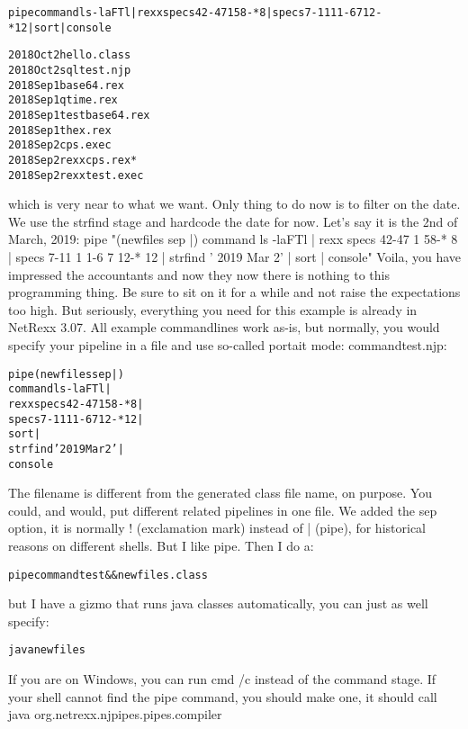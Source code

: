 \begin{alltt}
pipe command ls -laFTl | rexx specs 42-47 1 58-* 8 | specs 7-11 1 1-6 7 12-* 12 | sort | console
\end{alltt}
\begin{alltt}
2018 Oct 2 hello.class
2018 Oct 2 sqltest.njp
2018 Sep 1 base64.rex
2018 Sep 1 qtime.rex
2018 Sep 1 testbase64.rex
2018 Sep 1 thex.rex
2018 Sep 2 cps.exec
2018 Sep 2 rexxcps.rex*
2018 Sep 2 rexxtest.exec
\end{alltt}
which is very near to what we want. Only thing to do now is to filter on the date. We use the strfind stage and hardcode the date for now. Let's say it is the 2nd of March, 2019:
pipe "(newfiles sep |) command ls -laFTl | rexx specs 42-47 1 58-* 8 |  specs 7-11 1 1-6 7 12-* 12 | strfind ' 2019 Mar 2' | sort | console"
Voila, you have impressed the accountants and now they now there is nothing to this programming thing. Be sure to sit on it for a while and not raise the expectations too high.
But seriously, everything you need for this example is already in NetRexx 3.07. All example commandlines work as-is,  but normally, you would specify your pipeline in a file and use so-called portait mode:
commandtest.njp:
\begin{alltt}
pipe (newfiles sep |)
command ls -laFTl |
rexx specs 42-47 1 58-* 8 |
specs 7-11 1 1-6 7 12-* 12 |
sort |
strfind ' 2019 Mar 2' |
console
\end{alltt}
The filename is different from the generated class file name, on purpose. You could, and would, put different related pipelines in one file.
We added the sep option, it is normally ! (exclamation mark) instead of | (pipe), for historical reasons on different shells. But I like pipe.
Then I do a:
\begin{alltt}
pipe commandtest && newfiles.class
\end{alltt}
but I have a gizmo that runs java classes automatically, you can just as well specify:

\begin{alltt}
java newfiles
\end{alltt}
If you are on Windows, you can run cmd /c instead of the command stage. If your shell cannot find the pipe command, you should make one, it should call 
java org.netrexx.njpipes.pipes.compiler

